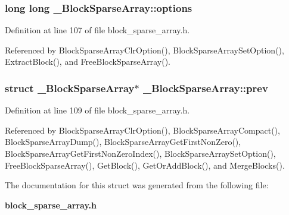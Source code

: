 \subsubsection{\setlength{\rightskip}{0pt plus 5cm}long long \bf{\_\-Block\-Sparse\-Array::options}}\label{struct__BlockSparseArray_ed1f10e7e8afcabd0c0d8e35522d0d11}




Definition at line 107 of file block\_\-sparse\_\-array.h.

Referenced by Block\-Sparse\-Array\-Clr\-Option(), Block\-Sparse\-Array\-Set\-Option(), Extract\-Block(), and Free\-Block\-Sparse\-Array().
\subsubsection{\setlength{\rightskip}{0pt plus 5cm}struct \bf{\_\-Block\-Sparse\-Array}$\ast$ \bf{\_\-Block\-Sparse\-Array::prev}}\label{struct__BlockSparseArray_af4c4f74c4b7cc4c3a3cd3d9e2ba9159}




Definition at line 109 of file block\_\-sparse\_\-array.h.

Referenced by Block\-Sparse\-Array\-Clr\-Option(), Block\-Sparse\-Array\-Compact(), Block\-Sparse\-Array\-Dump(), Block\-Sparse\-Array\-Get\-First\-Non\-Zero(), Block\-Sparse\-Array\-Get\-First\-Non\-Zero\-Index(), Block\-Sparse\-Array\-Set\-Option(), Free\-Block\-Sparse\-Array(), Get\-Block(), Get\-Or\-Add\-Block(), and Merge\-Blocks().

The documentation for this struct was generated from the following file:\begin{CompactItemize}
\item 
\bf{block\_\-sparse\_\-array.h}\end{CompactItemize}
